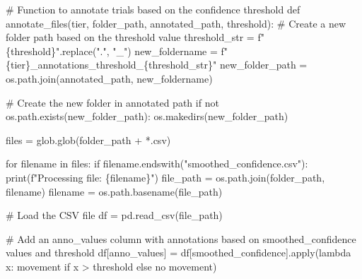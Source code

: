 \documentclass[
  letterpaper,
  DIV=11,
  numbers=noendperiod]{scrreprt}
\newenvironment{Shaded}{\begin{snugshade}}{\end{snugshade}}
\newcommand{\BuiltInTok}[1]{\textcolor[rgb]{0.00,0.23,0.31}{#1}}
\newcommand{\CommentTok}[1]{\textcolor[rgb]{0.37,0.37,0.37}{#1}}
\newcommand{\ControlFlowTok}[1]{\textcolor[rgb]{0.00,0.23,0.31}{#1}}
\newcommand{\KeywordTok}[1]{\textcolor[rgb]{0.00,0.23,0.31}{#1}}
\newcommand{\NormalTok}[1]{\textcolor[rgb]{0.00,0.23,0.31}{#1}}
\newcommand{\OperatorTok}[1]{\textcolor[rgb]{0.37,0.37,0.37}{#1}}
\newcommand{\SpecialCharTok}[1]{\textcolor[rgb]{0.37,0.37,0.37}{#1}}
\newcommand{\SpecialStringTok}[1]{\textcolor[rgb]{0.13,0.47,0.30}{#1}}
\newcommand{\StringTok}[1]{\textcolor[rgb]{0.13,0.47,0.30}{#1}}
\begin{document}
\begin{Shaded}
\begin{Highlighting}[]
\CommentTok{\# Function to annotate trials based on the confidence threshold}
\KeywordTok{def}\NormalTok{ annotate\_files(tier, folder\_path, annotated\_path, threshold):}
    \CommentTok{\# Create a new folder path based on the threshold value}
\NormalTok{    threshold\_str }\OperatorTok{=} \SpecialStringTok{f"}\SpecialCharTok{\{}\NormalTok{threshold}\SpecialCharTok{\}}\SpecialStringTok{"}\NormalTok{.replace(}\StringTok{"."}\NormalTok{, }\StringTok{"\_"}\NormalTok{)  }
\NormalTok{    new\_foldername }\OperatorTok{=} \SpecialStringTok{f"}\SpecialCharTok{\{}\NormalTok{tier}\SpecialCharTok{\}}\SpecialStringTok{\_annotations\_threshold\_}\SpecialCharTok{\{}\NormalTok{threshold\_str}\SpecialCharTok{\}}\SpecialStringTok{"} 
\NormalTok{    new\_folder\_path }\OperatorTok{=}\NormalTok{ os.path.join(annotated\_path, new\_foldername)}

    \CommentTok{\# Create the new folder in annotated path}
    \ControlFlowTok{if} \KeywordTok{not}\NormalTok{ os.path.exists(new\_folder\_path):}
\NormalTok{        os.makedirs(new\_folder\_path)}

\NormalTok{    files }\OperatorTok{=}\NormalTok{ glob.glob(folder\_path }\OperatorTok{+} \StringTok{\textquotesingle{}*.csv\textquotesingle{}}\NormalTok{)}

    \ControlFlowTok{for}\NormalTok{ filename }\KeywordTok{in}\NormalTok{ files:}
        \ControlFlowTok{if}\NormalTok{ filename.endswith(}\StringTok{"smoothed\_confidence.csv"}\NormalTok{): }
            \BuiltInTok{print}\NormalTok{(}\SpecialStringTok{f"Processing file: }\SpecialCharTok{\{}\NormalTok{filename}\SpecialCharTok{\}}\SpecialStringTok{"}\NormalTok{)}
\NormalTok{            file\_path }\OperatorTok{=}\NormalTok{ os.path.join(folder\_path, filename)}
\NormalTok{            filename }\OperatorTok{=}\NormalTok{ os.path.basename(file\_path)}

            \CommentTok{\# Load the CSV file}
\NormalTok{            df }\OperatorTok{=}\NormalTok{ pd.read\_csv(file\_path)}
            
            \CommentTok{\# Add an \textquotesingle{}anno\_values\textquotesingle{} column with annotations based on \textquotesingle{}smoothed\_confidence\textquotesingle{} values and threshold}
\NormalTok{            df[}\StringTok{\textquotesingle{}anno\_values\textquotesingle{}}\NormalTok{] }\OperatorTok{=}\NormalTok{ df[}\StringTok{\textquotesingle{}smoothed\_confidence\textquotesingle{}}\NormalTok{].}\BuiltInTok{apply}\NormalTok{(}\KeywordTok{lambda}\NormalTok{ x: }\StringTok{\textquotesingle{}movement\textquotesingle{}} \ControlFlowTok{if}\NormalTok{ x }\OperatorTok{\textgreater{}}\NormalTok{ threshold }\ControlFlowTok{else} \StringTok{\textquotesingle{}no movement\textquotesingle{}}\NormalTok{)}
            

\end{Highlighting}
\end{Shaded}
\end{document}
